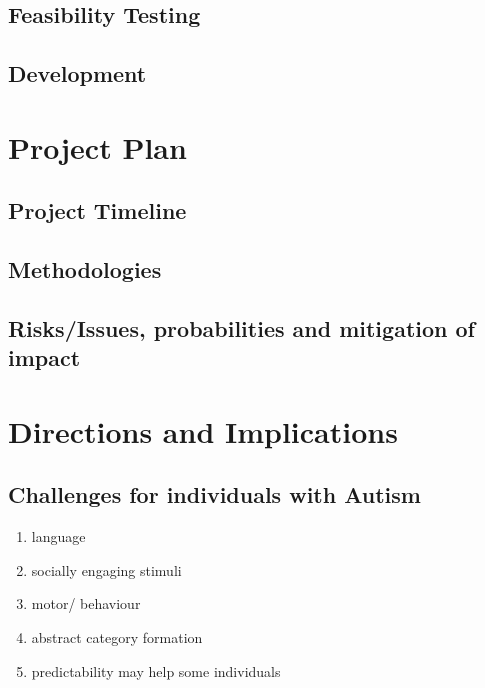 \documentclass[10pt]{article}
\begin{document}
\subsection{Feasibility Testing}

\subsection{Development}

\section{Project Plan}
\subsection{Project Timeline}
\subsection{Methodologies}

\subsection{Risks/Issues, probabilities and mitigation of impact}


\section{Directions and Implications}
\subsection{Challenges for individuals with Autism}

\begin{enumerate}
\item language
\item socially engaging stimuli
\item motor/ behaviour
\item abstract category formation
\item predictability may help some individuals

\end{enumerate}
\end{document}
